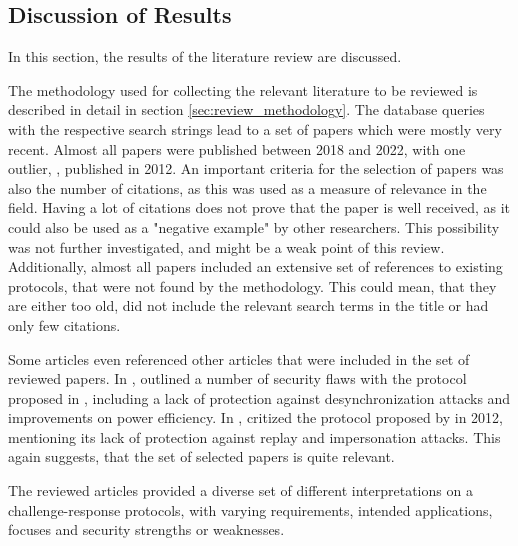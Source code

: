 
\subsection{Discussion of Results}
\label{sec:review_results}

In this section, the results of the literature review are discussed.

The methodology used for collecting the relevant literature to be reviewed is described in detail in section \ref{sec:review_methodology}.
The database queries with the respective search strings lead to a set of papers which were mostly very recent.
Almost all papers were published between 2018 and 2022, with one outlier, \cite{Majzoobi2012}, published in 2012.
An important criteria for the selection of papers was also the number of citations, as this was used as a measure of relevance
in the field. Having a lot of citations does not prove that the paper is well received, as it could also be used as a "negative example"
by other researchers. This possibility was not further investigated, and might be a weak point of this review.
Additionally, almost all papers included an extensive set of references to existing protocols, that were not found by the methodology.
This could mean, that they are either too old, did not include the relevant search terms in the title or had only few citations.

Some articles even referenced other articles that were included in the set of reviewed papers.
In \cite{Zhu2019}, \citeauthor*{Zhu2019} outlined a number of security flaws with the protocol proposed in \cite{Gope2018},
including a lack of protection against desynchronization attacks and improvements on power efficiency.
In \cite{Gope2022}, \citeauthor*{Gope2022} critized the protocol proposed by \citeauthor*{Majzoobi2012} in 2012,
mentioning its lack of protection against replay and impersonation attacks.
This again suggests, that the set of selected papers is quite relevant.

The reviewed articles provided a diverse set of different interpretations on a challenge-response protocols,
with varying requirements, intended applications, focuses and security strengths or weaknesses.

